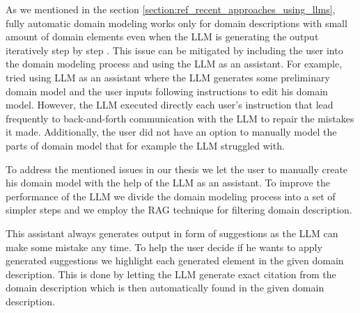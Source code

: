 As we mentioned in the section \ref{section:ref_recent_approaches_using_llms}, fully automatic domain modeling works only for domain descriptions with small amount of domain elements even when the LLM is generating the output iteratively step by step \cite{Saeedizade2024}. This issue can be mitigated by including the user into the domain modeling process \cite{Camara2023} and using the LLM as an assistant. For example, \citet{Camara2023} tried using LLM as an assistant where the LLM generates some preliminary domain model and the user inputs following instructions to edit his domain model. However, the LLM executed directly each user's instruction that lead frequently to back-and-forth communication with the LLM to repair the mistakes it made. Additionally, the user did not have an option to manually model the parts of domain model that for example the LLM struggled with.

To address the mentioned issues in our thesis we let the user to manually create his domain model with the help of the LLM as an assistant. To improve the performance of the LLM we divide the domain modeling process into a set of simpler steps and we employ the RAG technique for filtering domain description.

This assistant always generates output in form of suggestions as the LLM can make some mistake any time. To help the user decide if he wants to apply generated suggestions we highlight each generated element in the given domain description. This is done by letting the LLM generate exact citation from the domain description which is then automatically found in the given domain description.
